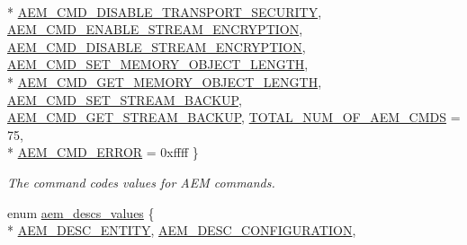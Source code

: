 \begin{DoxyCompactItemize}
\\*
\hyperlink{namespaceavdecc__lib_a1631d53b37995d16b597a5e1a78c55a5a69f41679b3ed4d4583ecf29d6f2a5fe8}{A\+E\+M\+\_\+\+C\+M\+D\+\_\+\+D\+I\+S\+A\+B\+L\+E\+\_\+\+T\+R\+A\+N\+S\+P\+O\+R\+T\+\_\+\+S\+E\+C\+U\+R\+I\+TY}, 
\hyperlink{namespaceavdecc__lib_a1631d53b37995d16b597a5e1a78c55a5a82336e5e52b52fc5899a45ffce214ee5}{A\+E\+M\+\_\+\+C\+M\+D\+\_\+\+E\+N\+A\+B\+L\+E\+\_\+\+S\+T\+R\+E\+A\+M\+\_\+\+E\+N\+C\+R\+Y\+P\+T\+I\+ON}, 
\hyperlink{namespaceavdecc__lib_a1631d53b37995d16b597a5e1a78c55a5aea3100d650904bfa60f8fb6f80bbad94}{A\+E\+M\+\_\+\+C\+M\+D\+\_\+\+D\+I\+S\+A\+B\+L\+E\+\_\+\+S\+T\+R\+E\+A\+M\+\_\+\+E\+N\+C\+R\+Y\+P\+T\+I\+ON}, 
\hyperlink{namespaceavdecc__lib_a1631d53b37995d16b597a5e1a78c55a5a193b02373d5f8c5eec7b5121f07517c3}{A\+E\+M\+\_\+\+C\+M\+D\+\_\+\+S\+E\+T\+\_\+\+M\+E\+M\+O\+R\+Y\+\_\+\+O\+B\+J\+E\+C\+T\+\_\+\+L\+E\+N\+G\+TH}, 
\\*
\hyperlink{namespaceavdecc__lib_a1631d53b37995d16b597a5e1a78c55a5abb1f8a79ba0b00fe0ee94ef4ca9e6cf4}{A\+E\+M\+\_\+\+C\+M\+D\+\_\+\+G\+E\+T\+\_\+\+M\+E\+M\+O\+R\+Y\+\_\+\+O\+B\+J\+E\+C\+T\+\_\+\+L\+E\+N\+G\+TH}, 
\hyperlink{namespaceavdecc__lib_a1631d53b37995d16b597a5e1a78c55a5a3bac9ebc3449d12a3852f57a96939e5d}{A\+E\+M\+\_\+\+C\+M\+D\+\_\+\+S\+E\+T\+\_\+\+S\+T\+R\+E\+A\+M\+\_\+\+B\+A\+C\+K\+UP}, 
\hyperlink{namespaceavdecc__lib_a1631d53b37995d16b597a5e1a78c55a5ae1cd7427d88b500871b78b4c30763ba5}{A\+E\+M\+\_\+\+C\+M\+D\+\_\+\+G\+E\+T\+\_\+\+S\+T\+R\+E\+A\+M\+\_\+\+B\+A\+C\+K\+UP}, 
\hyperlink{namespaceavdecc__lib_a1631d53b37995d16b597a5e1a78c55a5a2652011764b6cd6e327a6bcbbccb422b}{T\+O\+T\+A\+L\+\_\+\+N\+U\+M\+\_\+\+O\+F\+\_\+\+A\+E\+M\+\_\+\+C\+M\+DS} = 75, 
\\*
\hyperlink{namespaceavdecc__lib_a1631d53b37995d16b597a5e1a78c55a5ada262e1bc3d456b3991827e82638572d}{A\+E\+M\+\_\+\+C\+M\+D\+\_\+\+E\+R\+R\+OR} = 0xffff
 \}\begin{DoxyCompactList}\small\item\em The command codes values for A\+EM commands. \end{DoxyCompactList}
\item 
enum \hyperlink{namespaceavdecc__lib_ac7b7d227e46bc72b63ee9e9aae15902f}{aem\+\_\+descs\+\_\+values} \{ \\*
\hyperlink{namespaceavdecc__lib_ac7b7d227e46bc72b63ee9e9aae15902fac9ebb31a55e5894637f6c3c710ceceaf}{A\+E\+M\+\_\+\+D\+E\+S\+C\+\_\+\+E\+N\+T\+I\+TY}, 
\hyperlink{namespaceavdecc__lib_ac7b7d227e46bc72b63ee9e9aae15902fab391827cda146b0d4199adf80f47117a}{A\+E\+M\+\_\+\+D\+E\+S\+C\+\_\+\+C\+O\+N\+F\+I\+G\+U\+R\+A\+T\+I\+ON}, 

\end{DoxyCompactItemize}
